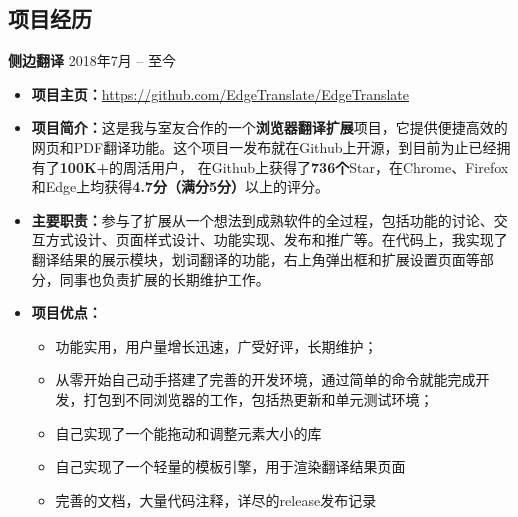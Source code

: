 \documentclass[10pt]{article} %
\begin{document}
\begin{paracol}{2}

\section{项目经历}


{\large{\textbf{侧边翻译}}} \hfill \textsc{2018年7月 -- 至今} %
	\begin{itemize}
		\item \textbf{项目主页：}\href{https://github.com/EdgeTranslate/EdgeTranslate}{\small{https://github.com/EdgeTranslate/EdgeTranslate}} %
		\item \textbf{项目简介：}{这是我与室友合作的一个\textbf{浏览器翻译扩展}项目，它提供便捷高效的网页和PDF翻译功能。这个项目一发布就在Github上开源，到目前为止已经拥有了\textbf{100K+}的周活用户，
		在Github上获得了\textbf{736个}Star，在Chrome、Firefox和Edge上均获得\textbf{4.7分（满分5分）}以上的评分。} %
		\item \textbf{主要职责：}{参与了扩展从一个想法到成熟软件的全过程，包括功能的讨论、交互方式设计、页面样式设计、功能实现、发布和推广等。在代码上，我实现了翻译结果的展示模块，划词翻译的功能，右上角弹出框和扩展设置页面等部分，同事也负责扩展的长期维护工作。} %
		\item \textbf{项目优点：}{
			\begin{itemize}
			\item 功能实用，用户量增长迅速，广受好评，长期维护；
			\item 从零开始自己动手搭建了完善的开发环境，通过简单的命令就能完成开发，打包到不同浏览器的工作，包括热更新和单元测试环境；
			\item 自己实现了一个能拖动和调整元素大小的库
			\item 自己实现了一个轻量的模板引擎，用于渲染翻译结果页面
			\item 完善的文档，大量代码注释，详尽的release发布记录
		\end{itemize}} %
	\end{itemize}




\end{paracol}
\end{document}

